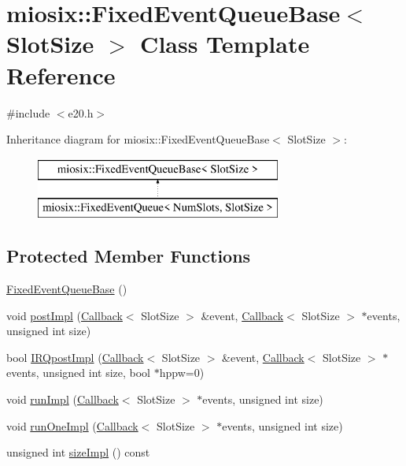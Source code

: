 \hypertarget{classmiosix_1_1_fixed_event_queue_base}{\section{miosix\-:\-:Fixed\-Event\-Queue\-Base$<$ Slot\-Size $>$ Class Template Reference}
\label{classmiosix_1_1_fixed_event_queue_base}
}


{\ttfamily \#include $<$e20.\-h$>$}

Inheritance diagram for miosix\-:\-:Fixed\-Event\-Queue\-Base$<$ Slot\-Size $>$\-:\begin{figure}[H]
\begin{center}
\leavevmode
\includegraphics[height=2.000000cm]{classmiosix_1_1_fixed_event_queue_base}
\end{center}
\end{figure}
\subsection*{Protected Member Functions}
\begin{DoxyCompactItemize}
\item 
\hyperlink{classmiosix_1_1_fixed_event_queue_base_a5ac7358122e2be23afef5d7a71465b23}{Fixed\-Event\-Queue\-Base} ()
\item 
void \hyperlink{classmiosix_1_1_fixed_event_queue_base_a10b30d8d410ddc5c801142bebbbc97a1}{post\-Impl} (\hyperlink{classmiosix_1_1_callback}{Callback}$<$ Slot\-Size $>$ \&event, \hyperlink{classmiosix_1_1_callback}{Callback}$<$ Slot\-Size $>$ $\ast$events, unsigned int size)
\item 
bool \hyperlink{classmiosix_1_1_fixed_event_queue_base_a92b1f4b425cd873df2d0d57ba3a7a154}{I\-R\-Qpost\-Impl} (\hyperlink{classmiosix_1_1_callback}{Callback}$<$ Slot\-Size $>$ \&event, \hyperlink{classmiosix_1_1_callback}{Callback}$<$ Slot\-Size $>$ $\ast$events, unsigned int size, bool $\ast$hppw=0)
\item 
void \hyperlink{classmiosix_1_1_fixed_event_queue_base_a90cb9c42f7f9c49606922dce57981e57}{run\-Impl} (\hyperlink{classmiosix_1_1_callback}{Callback}$<$ Slot\-Size $>$ $\ast$events, unsigned int size)
\item 
void \hyperlink{classmiosix_1_1_fixed_event_queue_base_a8a465be0d7cb59f5c0d568d1412c2d8a}{run\-One\-Impl} (\hyperlink{classmiosix_1_1_callback}{Callback}$<$ Slot\-Size $>$ $\ast$events, unsigned int size)
\item 
unsigned int \hyperlink{classmiosix_1_1_fixed_event_queue_base_ae92ece07b8a428d89502c0e62295a2b6}{size\-Impl} () const 
\end{DoxyCompactItemize}


